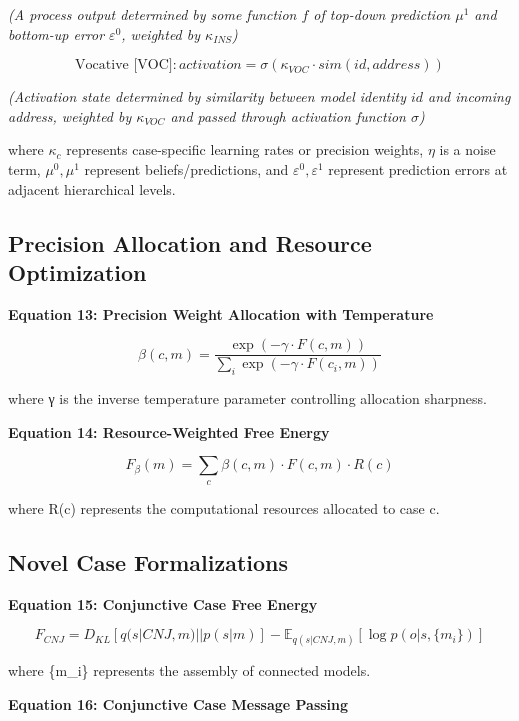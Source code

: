 \documentclass[
]{book}
\begin{document}
\emph{(A process output determined by some function \(f\) of top-down
prediction \(\mu^1\) and bottom-up error \(\varepsilon^0\), weighted by
\(\kappa_{INS}\))}

\[\text{Vocative [VOC]}: activation = \sigma(\kappa_{VOC} \cdot sim(id, address)) \tag{12a}\]

\emph{(Activation state determined by similarity between model identity
\(id\) and incoming address, weighted by \(\kappa_{VOC}\) and passed
through activation function \(\sigma\))}

where \(\kappa_c\) represents case-specific learning rates or precision
weights, \(\eta\) is a noise term, \(\mu^0, \mu^1\) represent
beliefs/predictions, and \(\varepsilon^0, \varepsilon^1\) represent
prediction errors at adjacent hierarchical levels.

\hypertarget{precision-allocation-and-resource-optimization}{%
\subsection{Precision Allocation and Resource
Optimization}\label{precision-allocation-and-resource-optimization}}

\textbf{Equation 13: Precision Weight Allocation with Temperature}

\[\beta(c,m) = \frac{\exp(-\gamma \cdot F(c,m))}{\sum_i \exp(-\gamma \cdot F(c_i,m))}  \tag{13}\]

where γ is the inverse temperature parameter controlling allocation
sharpness.

\textbf{Equation 14: Resource-Weighted Free Energy}

\[F_{\beta}(m) = \sum_c \beta(c,m) \cdot F(c,m) \cdot R(c)  \tag{14}\]

where R(c) represents the computational resources allocated to case c.

\hypertarget{novel-case-formalizations}{%
\subsection{Novel Case Formalizations}\label{novel-case-formalizations}}

\textbf{Equation 15: Conjunctive Case Free Energy}

\[
F_{CNJ} = D_{KL}[q(s|CNJ,m) || p(s|m)] - \mathbb{E}_{q(s|CNJ,m)}[\log p(o|s,\{m_i\})]  \tag{15}
\]

where \{m\_i\} represents the assembly of connected models.

\textbf{Equation 16: Conjunctive Case Message Passing}
\end{document}
